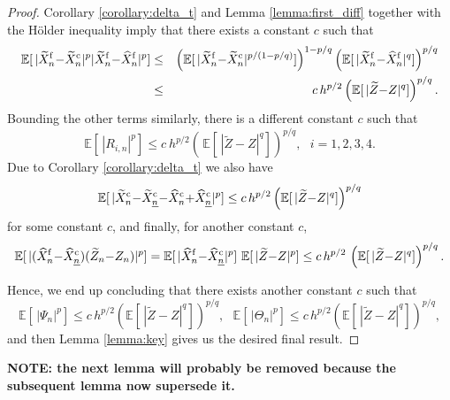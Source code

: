 \documentclass[review]{siamart190516}
\def \EE {{\mathbb{E}}}
\def \tZ {{\widetilde{Z}}}
\def \tXfn {{\widetilde{X}^{\rm f}_n}}
\def \tXcn {{\widetilde{X}^{\rm c}_n}}
\def \tXcl {{\widetilde{X}^{\rm c}_{\underline{n}}}}
\def \hXfn {{\widehat{X}^{\rm f}_n}}
\def \hXcn {{\widehat{X}^{\rm c}_n}}
\def \hXcl {{\widehat{X}^{\rm c}_{\underline{n}}}}
\begin{document}
\begin{proof}
Corollary \ref{corollary:delta_t} and Lemma \ref{lemma:first_diff} together 
with the H\"older inequality imply that there exists a constant $c$ such that
\begin{eqnarray*}
\EE[\, |\tXfn {-} \tXcn|^p |\tXfn {-} \hXfn|^p ]
&\leq& \left( \EE[\,|\tXfn {-} \tXcn|^{p/(1-p/q)}] \right)^{1 - p/q}
       \left( \EE[\,|\tXfn {-} \hXfn|^q] \right)^{p/q}
\\  &\leq& c\, h^{p/2} \left(\EE[\, |\tZ{-}Z|^q]\right)^{p/q}.
\end{eqnarray*}
Bounding the other terms similarly, there is a different constant $c$ such that
\[
\EE[\, |R_{i,n}|^p] \leq  c\ h^{p/2} \left(\,\EE[\,|\tZ{-}Z|^q] \right)^{p/q}, ~~~ i = 1, 2, 3, 4.
\]
Due to Corollary \ref{corollary:delta_t} we also have
\[
\EE[ \, |\tXcn {-} \tXcl {-} \hXcn {+} \hXcl |^p ] 
\leq c\, h^{p/2} \left(\EE[\,|\tZ{-}Z|^q] \right)^{p/q}
\]
for some constant $c$, and finally, for another constant $c$,
\[
\EE[ \, |  ( \hXfn {-} \hXcl ) (\tZ_n {-} Z_n)|^p ]
= \EE[ \, | \hXfn {-} \hXcl|^p] ~ \EE[\, |\tZ {-} Z|^p]
\leq c \, h^{p/2}\, \left( \EE[\,|\tZ{-}Z|^q] \right)^{p/q}.
\]

Hence, we end up concluding that there exists another constant $c$ such that
\[
\EE[\, |\Psi_n|^p ] \leq c\, h^{p/2} \left( \EE[\,|\tZ{-}Z|^q] \right)^{p/q}, ~~~
\EE[\, |\Theta_n|^p ] \leq c\, h^{p/2} \left( \EE[\,|\tZ{-}Z|^q] \right)^{p/q},
\]
and then Lemma \ref{lemma:key} gives us the desired final result.
\end{proof}


{\bf NOTE: the next lemma will probably be removed because the 
subsequent lemma now supersede it.}
\end{document}
